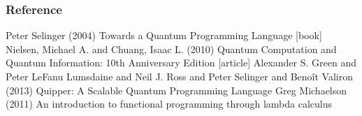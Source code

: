 \documentclass[12pt,hyperref={unicode}]{beamer}
\begin{document}
\begin{frame}
\frametitle{Reference}
\footnotesize{
\begin{thebibliography}{99} %
 Peter Selinger (2004)
\newblock Towards a Quantum Programming Language
[book]
 Nielsen, Michael A. and Chuang, Isaac L. (2010)
\newblock Quantum Computation and Quantum Information: 10th Anniversary Edition
[article]
 Alexander S. Green and Peter LeFanu Lumsdaine and Neil J. Ross and Peter Selinger and Benoît Valiron (2013)
\newblock Quipper: A Scalable Quantum Programming Language
 Greg Michaelson (2011)
\newblock An introduction to functional programming through lambda calculus
\end{thebibliography}
}
\end{frame}

\end{document}
